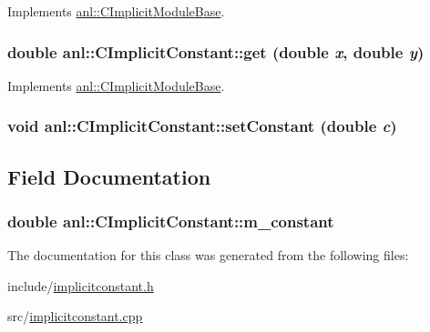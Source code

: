 Implements \hyperlink{classanl_1_1CImplicitModuleBase_ac17d592612c82ba3d47f9229a00b1fe3}{anl::CImplicitModuleBase}.\hypertarget{classanl_1_1CImplicitConstant_afc877ea9b1b8f119f7aeea2dde8b8190}{
\subsubsection[{get}]{\setlength{\rightskip}{0pt plus 5cm}double anl::CImplicitConstant::get (double {\em x}, \/  double {\em y})}}
\label{classanl_1_1CImplicitConstant_afc877ea9b1b8f119f7aeea2dde8b8190}


Implements \hyperlink{classanl_1_1CImplicitModuleBase_ab88f8a1822dcfbc13ba5230318b0acd1}{anl::CImplicitModuleBase}.\hypertarget{classanl_1_1CImplicitConstant_a12fae8c74864579fb3e1a3ea1dd89d72}{
\subsubsection[{setConstant}]{\setlength{\rightskip}{0pt plus 5cm}void anl::CImplicitConstant::setConstant (double {\em c})}}
\label{classanl_1_1CImplicitConstant_a12fae8c74864579fb3e1a3ea1dd89d72}


\subsection{Field Documentation}
\hypertarget{classanl_1_1CImplicitConstant_af01da7bdcbf17e65c6d7148fed49e82d}{
\subsubsection[{m\_\-constant}]{\setlength{\rightskip}{0pt plus 5cm}double {\bf anl::CImplicitConstant::m\_\-constant}}}
\label{classanl_1_1CImplicitConstant_af01da7bdcbf17e65c6d7148fed49e82d}


The documentation for this class was generated from the following files:\begin{DoxyCompactItemize}
\item 
include/\hyperlink{implicitconstant_8h}{implicitconstant.h}\item 
src/\hyperlink{implicitconstant_8cpp}{implicitconstant.cpp}\end{DoxyCompactItemize}
